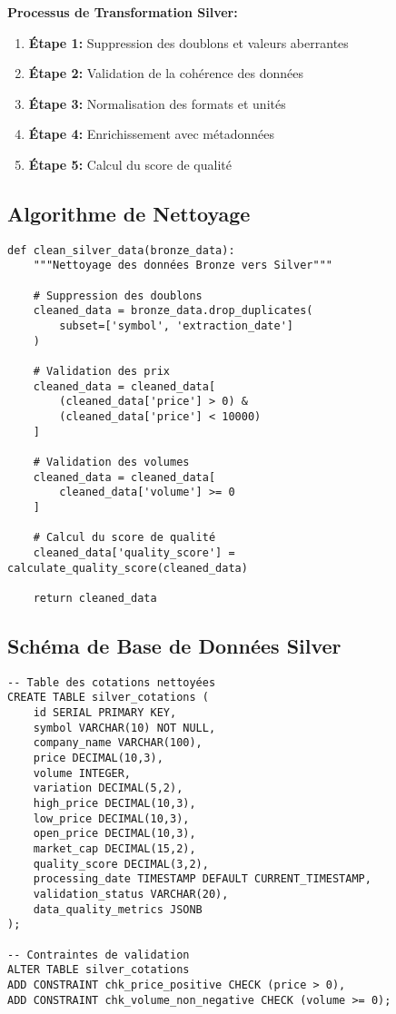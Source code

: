 \textbf{Processus de Transformation Silver:}
\begin{enumerate}
    \item \textbf{Étape 1:} Suppression des doublons et valeurs aberrantes
    \item \textbf{Étape 2:} Validation de la cohérence des données
    \item \textbf{Étape 3:} Normalisation des formats et unités
    \item \textbf{Étape 4:} Enrichissement avec métadonnées
    \item \textbf{Étape 5:} Calcul du score de qualité
\end{enumerate}

\subsection{Algorithme de Nettoyage}

\begin{verbatim}
def clean_silver_data(bronze_data):
    """Nettoyage des données Bronze vers Silver"""
    
    # Suppression des doublons
    cleaned_data = bronze_data.drop_duplicates(
        subset=['symbol', 'extraction_date']
    )
    
    # Validation des prix
    cleaned_data = cleaned_data[
        (cleaned_data['price'] > 0) &
        (cleaned_data['price'] < 10000)
    ]
    
    # Validation des volumes
    cleaned_data = cleaned_data[
        cleaned_data['volume'] >= 0
    ]
    
    # Calcul du score de qualité
    cleaned_data['quality_score'] = calculate_quality_score(cleaned_data)
    
    return cleaned_data
\end{verbatim}

\subsection{Schéma de Base de Données Silver}

\begin{verbatim}
-- Table des cotations nettoyées
CREATE TABLE silver_cotations (
    id SERIAL PRIMARY KEY,
    symbol VARCHAR(10) NOT NULL,
    company_name VARCHAR(100),
    price DECIMAL(10,3),
    volume INTEGER,
    variation DECIMAL(5,2),
    high_price DECIMAL(10,3),
    low_price DECIMAL(10,3),
    open_price DECIMAL(10,3),
    market_cap DECIMAL(15,2),
    quality_score DECIMAL(3,2),
    processing_date TIMESTAMP DEFAULT CURRENT_TIMESTAMP,
    validation_status VARCHAR(20),
    data_quality_metrics JSONB
);

-- Contraintes de validation
ALTER TABLE silver_cotations 
ADD CONSTRAINT chk_price_positive CHECK (price > 0),
ADD CONSTRAINT chk_volume_non_negative CHECK (volume >= 0);
\end{verbatim}


